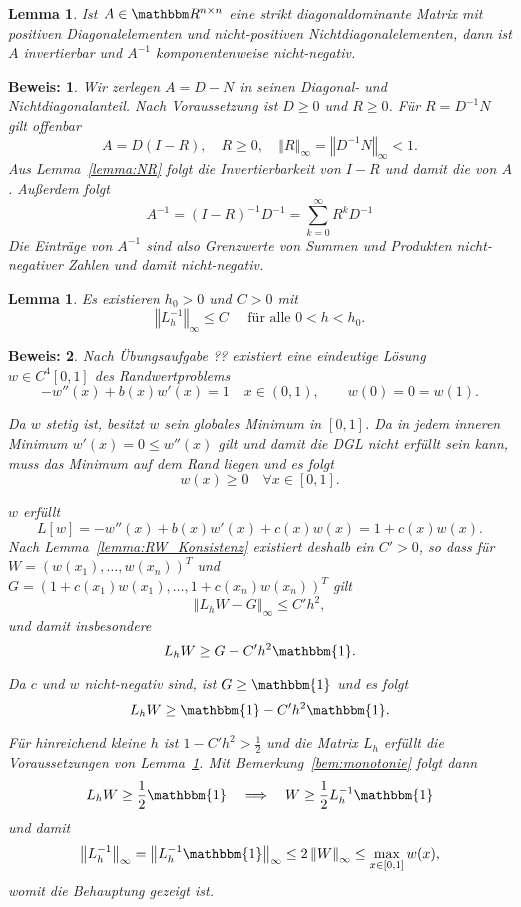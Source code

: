 \documentclass[12pt,a4paper]{book}
\theoremstyle{break}
\newtheorem{lemma}[theorem]{Lemma}
\theoremstyle{nonumberplain}
\newtheorem{beweis}{Beweis:}
\newcommand{\R}{\mathbbm R}
\newcommand{\norm}[1]{\left\Vert#1\right\Vert}		%
\newcommand{\1}{\mathbbm{1}} 			      	%
\begin{document}
\begin{lemma}\label{lemma:wann_M}
Ist $A\in \R^{n\times n}$ eine strikt diagonaldominante Matrix mit positiven Diagonalelementen und nicht-positiven Nichtdiagonalelementen, dann ist $A$ invertierbar und $A^{-1}$ komponentenweise nicht-negativ.
\end{lemma}
\begin{beweis}
Wir zerlegen $A=D-N$ in seinen Diagonal- und Nichtdiagonalanteil. Nach Voraussetzung ist $D\geq 0$ und $R\geq 0$. Für $R=D^{-1} N$ gilt offenbar
\[
A=D (I-R), \quad R\geq 0, \quad \norm{R}_\infty=\norm{D^{-1} N}_\infty<1.
\]
Aus Lemma~\ref{lemma:NR} folgt die Invertierbarkeit von $I-R$ und damit die von $A$.
Außerdem folgt
\[
A^{-1}=(I-R)^{-1} D^{-1} =\sum_{k=0}^\infty {R^k} D^{-1}
\]
Die Einträge von $A^{-1}$ sind also Grenzwerte von Summen und Produkten nicht-negativer Zahlen und damit nicht-negativ.
\end{beweis}


\begin{lemma}\label{lemma:RW_stabil}
Es existieren $h_0>0$ und $C>0$ mit 
\[
\norm{L_h^{-1}}_\infty\leq C \quad \mbox{ für alle } 0<h<h_0.
\]
\end{lemma}
\begin{beweis}
Nach Übungsaufgabe ?? existiert eine eindeutige Lösung $w\in C^4[0,1]$ des Randwertproblems
\[
-w''(x) + b(x)w'(x) = 1 \quad x\in (0,1), \qquad w(0)=0=w(1).
\]

Da $w$ stetig ist, besitzt $w$ sein globales Minimum in $[0,1]$. Da in jedem inneren Minimum $w'(x)=0\leq w''(x)$
gilt und damit die DGL nicht erfüllt sein kann, muss das Minimum auf dem Rand liegen und es folgt
\[
w(x)\geq 0 \quad \forall x\in [0,1].
\]


$w$ erfüllt
\[
L[w]=-w''(x) + b(x)w'(x) + c(x)w(x)= 1+c(x)w(x).
\]
Nach Lemma~\ref{lemma:RW_Konsistenz} existiert deshalb ein $C'>0$, so dass für 
$W=(w(x_1),\ldots,w(x_{n}))^T$ 
und $G=(1+c(x_1)w(x_1),\ldots,1+c(x_n)w(x_{n}))^T$ gilt
\[
\norm{L_h W - G}_\infty \leq C' h^2,
\]
und damit insbesondere
\[
L_h W \geq G- C'h^2 \1.
\]

Da $c$ und $w$ nicht-negativ sind, ist $G\geq \1$ und es folgt
\[
L_h W \geq \1 - C' h^2\1.
\]

Für hinreichend kleine $h$ ist $1-C'h^2>\frac{1}{2}$ und die Matrix 
$L_h$ erfüllt die Voraussetzungen von Lemma~\ref{lemma:wann_M}. Mit Bemerkung~\ref{bem:monotonie}
folgt dann
\[
L_h W\geq \frac{1}{2} \1 \quad \Longrightarrow \quad W\geq \frac{1}{2}{L_h^{-1}\1}
\]
und damit 
\[
\norm{L_h^{-1}}_\infty = \norm{L_h^{-1} \1}_\infty \leq 2 \norm{W}_\infty\leq \max_{x\in [0,1]} w(x),
\]
womit die Behauptung gezeigt ist.
\end{beweis}
\end{document}
